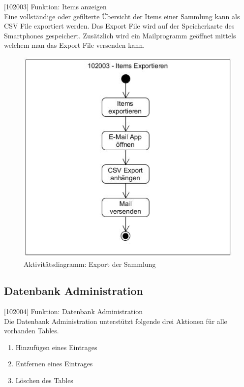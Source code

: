 [102003] Funktion: Items anzeigen\\

Eine vollständige oder gefilterte Übersicht der Items einer Sammlung kann als CSV File exportiert werden. Das Export File wird auf der Speicherkarte des Smartphones gespeichert. Zusätzlich wird ein Mailprogramm geöffnet mittels welchem man das Export File versenden kann.

\begin{figure}[htbp]
	\centering
	\includegraphics[scale=0.6]{pic/102003}
	\caption{Aktivitätsdiagramm: Export der Sammlung}
\end{figure}

\subsection{Datenbank Administration}

[102004] Funktion: Datenbank Administration\\

Die Datenbank Administration unterstützt folgende drei Aktionen für alle vorhanden Tables.

\begin{enumerate}
	\item Hinzufügen eines Eintrages
	\item Entfernen eines Eintrages
	\item Löschen des Tables
\end{enumerate}

